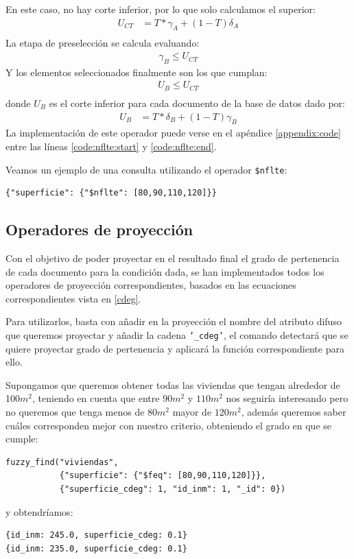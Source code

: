 En este caso, no hay corte inferior, por lo que solo calculamos el superior:
%
\begin{align*}
    U_{CT} &= T * \gamma_A + (1-T)\delta_A \\
\end{align*}
%
La etapa de preselección se calcula evaluando:
%
\begin{align*}
    \gamma_B \leq U_{CT}
\end{align*}
%
Y los elementos seleccionados finalmente son los que cumplan:
%
\begin{align*}
    U_B \leq U_{CT} \\
\end{align*}
%
donde $U_B$ es el corte inferior para cada documento de la base de datos dado por:
%
\begin{align*}
    U_B &= T * \delta_B + (1-T)\gamma_B
\end{align*}
%
La implementación de este operador puede verse en el apéndice \ref{appendix:code} entre las líneas \ref{code:nflte:start} y \ref{code:nflte:end}.

\begin{example}
Veamos un ejemplo de una consulta utilizando el operador \texttt{\$nflte}:
%
\begin{verbatim}
{"superficie": {"$nflte": [80,90,110,120]}}
\end{verbatim}

\end{example}

\subsection{Operadores de proyección}

Con el objetivo de poder proyectar en el resultado final el grado de pertenencia de cada documento para la condición dada, se han implementados todos los operadores de proyección correspondientes, basados en las ecuaciones correspondientes vista en \ref{cdeg}.

Para utilizarlos, basta con añadir en la proyección el nombre del atributo difuso que queremos proyectar y añadir la cadena \texttt{'\_cdeg'}, el comando detectará que se quiere proyectar grado de pertenencia y aplicará la función correspondiente para ello.

\begin{example}
Supongamos que queremos obtener todas las viviendas que tengan alrededor de 100$m^2$, teniendo en cuenta que entre $90m^2$ y $110m^2$ nos seguiría interesando pero no queremos que tenga menos de $80m^2$  mayor de $120m^2$, además queremos saber cuáles corresponden mejor con nuestro criterio, obteniendo el grado en que se cumple:
%
\begin{verbatim}
fuzzy_find("viviendas",
           {"superficie": {"$feq": [80,90,110,120]}},
           {"superficie_cdeg": 1, "id_inm": 1, "_id": 0})
\end{verbatim}
%
y obtendríamos:
%
\begin{lstlisting}[numbers=none]
{id_inm: 245.0, superficie_cdeg: 0.1}
{id_inm: 235.0, superficie_cdeg: 0.1}
\end{lstlisting}
%
\end{example}
